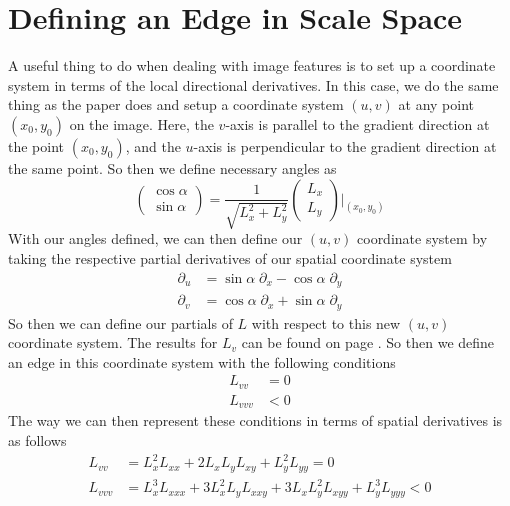 \documentclass{article}
\begin{document}
\section{Defining an Edge in Scale Space}
A useful thing to do when dealing with image features is to set up a coordinate system in terms of the local directional derivatives.
In this case, we do the same thing as the paper does and setup a coordinate system $(u,v)$ at any point $(x_0,y_0)$ on the image.
Here, the $v$-axis is parallel to the gradient direction at the point $(x_0, y_0)$, and the $u$-axis is perpendicular to the gradient direction at the same point. So then we define necessary angles as \cite{Lindeberg1998}
\begin{equation}
  \begin{pmatrix}
    \cos{\alpha} \\
    \sin{\alpha}
  \end{pmatrix}
  = \frac{1}{\sqrt{L_x^2+L_y^2}}
  \begin{pmatrix}
    L_x \\
    L_y
  \end{pmatrix}
  \Bigg|_{(x_0,y_0)}
\end{equation}
With our angles defined, we can then define our $(u,v)$ coordinate system by taking the respective partial derivatives of our spatial coordinate system
\begin{align}
  \partial_u &= \sin{\alpha}\; \partial_x - \cos{\alpha}\; \partial_y \\
  \partial_v &= \cos{\alpha}\; \partial_x + \sin{\alpha}\; \partial_y
\end{align}
So then we can define our partials of $L$ with respect to this new $(u,v)$ coordinate system. The results for $L_v$ can be found on page \pageref{t_v}. So then we define an edge in this coordinate system with the following conditions \cite{Lindeberg1998}
\begin{equation} \label{eq:c1}
  \begin{aligned}
    L_{vv} &= 0 \\
    L_{vvv} &< 0
  \end{aligned}
\end{equation}
The way we can then represent these conditions in terms of spatial derivatives is as follows \cite{Lindeberg1998}
\begin{equation}
  \begin{aligned}
    L_{vv} &= L_x^2L_{xx}+2L_xL_yL_{xy}+L_y^2L_{yy} = 0 \\
    L_{vvv} &= L_x^3L_{xxx} +3L_x^2L_yL_{xxy}+3L_xL_y^2L_{xyy}+L_y^3L_{yyy} < 0
  \end{aligned}
\end{equation}
\end{document}
